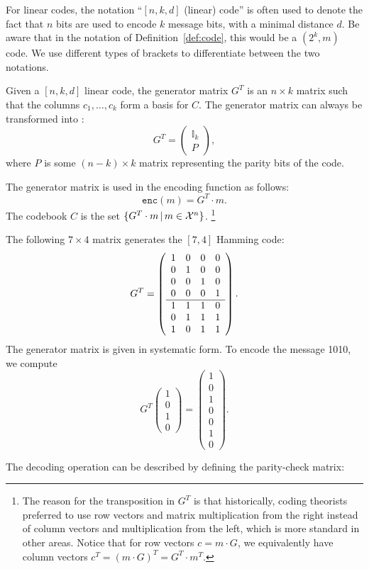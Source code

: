 For linear codes, the notation ``$[n,k,d]$ (linear) code'' is often used to denote the fact that $n$ bits are used to encode $k$ message bits, with a minimal distance $d$. Be aware that in the notation of Definition~\ref{def:code}, this would be a $(2^k, m)$ code. We use different types of brackets to differentiate between the two notations.

\begin{definition}
Given a $[n,k,d]$ linear code, the generator matrix $G^T$ is an $n \times k$ matrix such that the columns $c_1, \ldots, c_k$ form a basis for $C$. The generator matrix can always be transformed into :
\[
G^T = 
\left(
\begin{array}{c}
\mathbb{I}_k\\
\hline
P
\end{array}
\right),
\]
where $P$ is some $(n-k) \times k$ matrix representing the parity bits of the code.
\end{definition}
The generator matrix is used in the encoding function as follows:
\[
\mathtt{enc}(m) = G^T \cdot m.
\]
The codebook $C$ is the set $\{G^T \cdot m\,|\,m \in \mathcal{X}^n\}$.
\footnote{The reason for the transposition in $G^T$ is that historically, coding theorists preferred to use row vectors and matrix multiplication from the right instead of column vectors and multiplication from the left, which is more standard in other areas. Notice that for row vectors $c = m \cdot G$, we equivalently have column vectors $c^T = (m \cdot G)^T = G^T \cdot m^T$.}

\begin{example}
The following $7 \times 4$ matrix generates the $[7,4]$ Hamming code:
\[
G^T = 
\left(
\begin{array}{c c c c}
1 & 0 & 0 & 0\\
0 & 1 & 0 & 0\\
0 & 0 & 1 & 0\\
0 & 0 & 0 & 1\\
\hline
1 & 1 & 1 & 0\\
0 & 1 & 1 & 1\\
1 & 0 & 1 & 1
\end{array}
\right).
\]
The generator matrix is given in systematic form. To encode the message 1010, we compute
\[
G^T \left(\begin{array}{c}
1\\0\\1\\0
\end{array}\right) = \left(\begin{array}{c}
1\\0\\1\\0\\0\\1\\0
\end{array}\right).
\]
\end{example}
The decoding operation can be described by defining the parity-check matrix:

